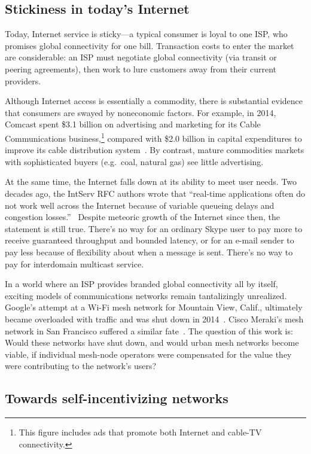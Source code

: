 \subsection{Stickiness in today's Internet}

Today, Internet service is sticky---a typical consumer is loyal to one
ISP, who promises global connectivity for one bill. Transaction costs
to enter the market are considerable: an ISP must negotiate global
connectivity (via transit or peering agreements), then work to lure
customers away from their current providers.

Although Internet access is essentially a commodity, there is
substantial evidence that consumers are swayed by noneconomic
factors. For example, in 2014, Comcast spent \$3.1 billion on advertising and
marketing for its Cable Communications business,\footnote{This figure
  includes ads that promote both Internet and cable-TV connectivity.}
compared with \$2.0 billion in capital expenditures to improve its
cable distribution system~\cite{comcastannualreport}. By contrast,
mature commodities markets with sophisticated buyers (e.g.~coal,
natural gas) see little advertising.

At the same time, the Internet falls down at its ability to meet user
needs. Two decades ago, the IntServ RFC authors wrote that ``real-time
applications often do not work well across the Internet because of
variable queueing delays and congestion losses.''~\cite{rfc1633}
Despite meteoric growth of the Internet since then, the statement is
still true. There's no way for an ordinary Skype user to pay more to receive
guaranteed throughput and bounded latency, or for an e-mail sender to
pay less because of flexibility about when a message is sent. There's no
way to pay for interdomain multicast service.

In a world where an ISP provides branded global connectivity all by
itself, exciting models of communications networks remain
tantalizingly unrealized.  Google's attempt at a Wi-Fi mesh network
for Mountain View, Calif., ultimately became overloaded with traffic
and was shut down in 2014~\cite{pcworld13}. Cisco Meraki's mesh
network in San Francisco suffered a similar fate~\cite{economist14}.
The question of this work is: Would these networks have shut down, and
would urban mesh networks become viable, if individual mesh-node
operators were compensated for the value they were contributing
to the network's users?

\subsection{Towards self-incentivizing networks}
\label{ss:towards}


